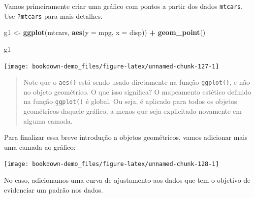 \documentclass[]{book}
\newenvironment{Shaded}{\begin{snugshade}}{\end{snugshade}}
\newcommand{\KeywordTok}[1]{\textcolor[rgb]{0.13,0.29,0.53}{\textbf{#1}}}
\newcommand{\DataTypeTok}[1]{\textcolor[rgb]{0.13,0.29,0.53}{#1}}
\newcommand{\StringTok}[1]{\textcolor[rgb]{0.31,0.60,0.02}{#1}}
\newcommand{\OperatorTok}[1]{\textcolor[rgb]{0.81,0.36,0.00}{\textbf{#1}}}
\newcommand{\NormalTok}[1]{#1}
\begin{document}
Vamos primeiramente criar uma gráfico com pontos a partir dos dados
\texttt{mtcars}. Use \texttt{?mtcars} para mais detalhes.

\begin{Shaded}
\begin{Highlighting}[]
\NormalTok{g1 <-}\StringTok{ }\KeywordTok{ggplot}\NormalTok{(mtcars, }\KeywordTok{aes}\NormalTok{(}\DataTypeTok{y =}\NormalTok{ mpg, }\DataTypeTok{x =}\NormalTok{ disp)) }\OperatorTok{+}
\StringTok{  }\KeywordTok{geom_point}\NormalTok{()}

\NormalTok{g1}
\end{Highlighting}
\end{Shaded}

\begin{center}\texttt{[image: bookdown-demo\_files/figure-latex/unnamed-chunk-127-1]} \end{center}

\begin{quote}
Note que o \texttt{aes()} está sendo usado diretamente na função
\texttt{ggplot()}, e não no objeto geométrico. O que isso significa? O
mapeamento estético definido na função \texttt{ggplot()} é global. Ou
seja, é aplicado para todos os objetos geométricos daquele gráfico, a
menos que seja explicitado novamente em alguma camada.
\end{quote}

Para finalizar essa breve introdução a objetos geométricos, vamos
adicionar mais uma camada ao gráfico:

\begin{Shaded}
\end{Shaded}

\begin{center}\texttt{[image: bookdown-demo\_files/figure-latex/unnamed-chunk-128-1]} \end{center}

No caso, adicionamos uma curva de ajustamento aos dados que tem o
objetivo de evidenciar um padrão nos dados.
\end{document}
